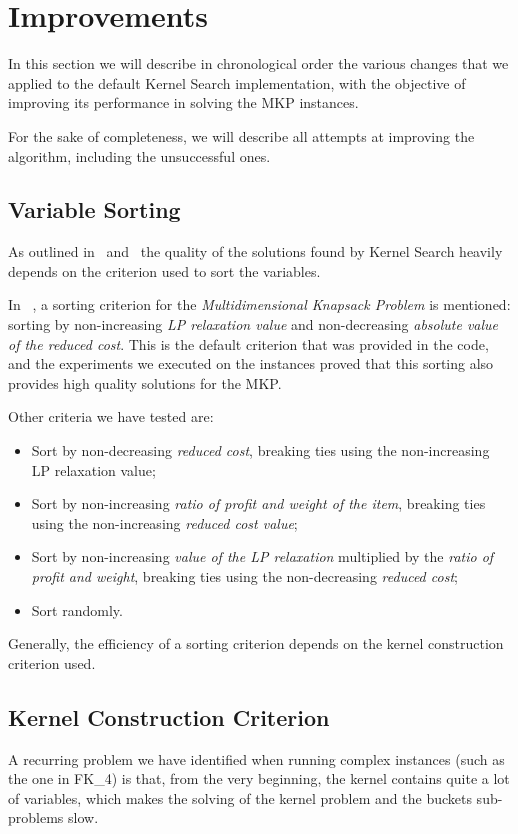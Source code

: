 \chapter{Improvements}\label{ch:improvements}
In this section we will describe in chronological order the various changes
that we applied to the default Kernel Search implementation,
with the objective of improving its performance
in solving the MKP instances.

For the sake of completeness, we will describe all attempts at improving
the algorithm, including the unsuccessful ones.


\section{Variable Sorting}
As outlined in~\cite{kernel:2010} and~\cite{kernel:2012} the quality of
the solutions found by Kernel Search heavily depends on the criterion used to sort the variables.

In ~\cite{kernel:2010}, a sorting criterion for the \textit{Multidimensional Knapsack Problem} is mentioned:
sorting by non-increasing \textit{LP relaxation value} and non-decreasing \textit{absolute value of the reduced cost}.
This is the default criterion that was provided in the code, and
the experiments we executed on the instances proved that this sorting also
provides high quality solutions for the MKP\@.

Other criteria we have tested are:
\begin{itemize}
    \item Sort by non-decreasing \textit{reduced cost}, breaking ties using the non-increasing {LP relaxation value};
    \item Sort by non-increasing \textit{ratio of profit and weight of the item}, breaking ties using the
    non-increasing \textit{reduced cost value};
    \item Sort by non-increasing \textit{value of the LP relaxation} multiplied by the \textit{ratio of profit and
    weight},    breaking ties using the non-decreasing \textit{reduced cost};
    \item Sort randomly.
\end{itemize}

Generally, the efficiency of a sorting criterion depends on the kernel construction criterion used.


\section{Kernel Construction Criterion}\label{sec:kernel_criteria}
A recurring problem we have identified when running complex
instances (such as the one in FK\_4) is that,
from the very beginning, the kernel contains quite a lot of variables,
which makes the solving of the kernel problem and the buckets sub-problems slow.

